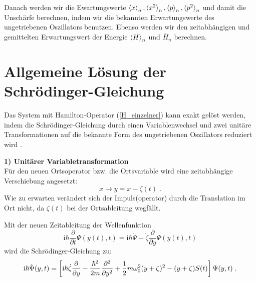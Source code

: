       Danach werden wir die Ewartungswerte $\braket{x}_n,\braket{x^2}_n,\braket{p}_n,\braket{p^2}_n$ und damit die Unschärfe berechnen, indem wir die bekannten Erwartungswerte des ungetriebenen Oszillators benutzen.
      Ebenso werden wir den zeitabhängigen und gemittelten Erwartungswert der Energie $\braket{H}_n$ und $\bar H_n$ berechnen.
\fi


    \section{Allgemeine Lösung der Schrödinger-Gleichung}
      \label{lsg_einzelner}
      Das System mit Hamilton-Operator (\ref{H_einzelner}) kann exakt gelöst werden, indem die Schrödinger-Gleichung durch einen Variablenwechsel und zwei unitäre Transformationen auf die bekannte Form des ungetriebenen Oszillators reduziert wird \cite{haengi}.

      \textbf{1) Unitärer Variabletransformation}\\
      Für den neuen Ortsoperator bzw. die Ortsvariable wird eine zeitabhängige Verschiebung angesetzt:
      \begin{equation}
        x \rightarrow y=x-\zeta(t) \; .
      \end{equation}
      Wie zu erwarten verändert sich der Impuls(operator) durch die Translation im Ort nicht, da $\zeta(t)$ bei der Ortsableitung wegfällt.

      Mit der neuen Zeitableitung der Wellenfunktion
      \begin{equation}
        \text{i}\hbar \frac{\partial}{\partial t} \Psi(y(t),t) = \text{i}\hbar \dot{\Psi} -\dot{\zeta}\frac{\partial}{\partial y}\Psi(y(t),t)
      \end{equation}
      wird die Schrödinger-Gleichung zu:
      \begin{equation}
        \text i \hbar \dot{\Psi}(y,t) = \left[\text i \hbar \dot{\zeta}\frac{\partial}{\partial y}-\frac{\hbar^2}{2m}\frac{\partial^2}{\partial y^2}+\frac{1}{2}m\omega_0^2(y+\zeta)^2-(y+\zeta)S(t)\right]\Psi(y,t) \; .
        \label{schroedinger_einzeln_getrieben}
      \end{equation}


